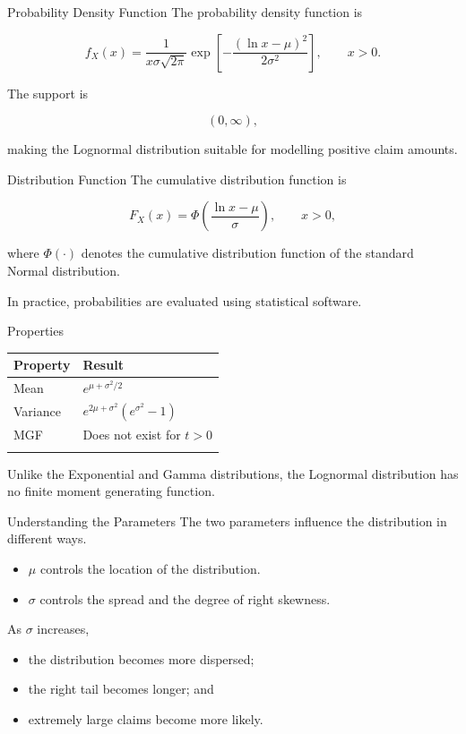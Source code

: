 \documentclass[
  ignorenonframetext,
  aspectratio=169,
]{beamer}
\newcounter{none} %
\providecommand{\tightlist}{%
  \setlength{\itemsep}{0pt}\setlength{\parskip}{0pt}}
\begin{document}
\begin{frame}{Probability Density Function}
\protect{}\label{probability-density-function}
The probability density function is

\[
f_X(x)=
\frac{1}{x\sigma\sqrt{2\pi}}
\exp\!\left[
-\frac{(\ln x-\mu)^2}{2\sigma^2}
\right],
\qquad x>0.
\]

The support is

\[
(0,\infty),
\]

making the Lognormal distribution suitable for modelling positive claim
amounts.
\end{frame}

\begin{frame}{Distribution Function}
\protect{}\label{distribution-function-1}
The cumulative distribution function is

\[
F_X(x)
=
\Phi
\left(
\frac{\ln x-\mu}{\sigma}
\right),
\qquad x>0,
\]

where \(\Phi(\cdot)\) denotes the cumulative distribution function of
the standard Normal distribution.

In practice, probabilities are evaluated using statistical software.
\end{frame}

\begin{frame}{Properties}
\protect{}\label{properties-1}
{\def\LTcaptype{none} %
\begin{longtable}[]{@{}ll@{}}
\toprule\noalign{}
Property & Result \\
\midrule\noalign{}
\endhead
Mean & \(e^{\mu+\sigma^2/2}\) \\
Variance & \(e^{2\mu+\sigma^2}\left(e^{\sigma^2}-1\right)\) \\
MGF & Does not exist for \(t>0\) \\
\bottomrule\noalign{}
\end{longtable}
}

Unlike the Exponential and Gamma distributions, the Lognormal
distribution has no finite moment generating function.
\end{frame}

\begin{frame}{Understanding the Parameters}
\protect{}\label{understanding-the-parameters}
The two parameters influence the distribution in different ways.

\begin{itemize}
\tightlist
\item
  \(\mu\) controls the location of the distribution.
\item
  \(\sigma\) controls the spread and the degree of right skewness.
\end{itemize}

As \(\sigma\) increases,

\begin{itemize}
\tightlist
\item
  the distribution becomes more dispersed;
\item
  the right tail becomes longer; and
\item
  extremely large claims become more likely.
\end{itemize}
\end{frame}
\end{document}
